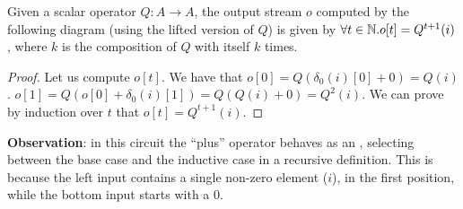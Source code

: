 \begin{theorem}
Given a scalar operator $Q: A \rightarrow A$, the output stream $o$ computed by the 
following diagram (using the lifted version of $Q$) is given by $\forall t \in \mathbb{N} . o[t] = Q^{t+1}(i)$, where $k$ is the composition
of $Q$ with itself $k$ times.

\end{theorem}
\begin{proof}
  Let us compute $o[t]$.  We have that $o[0] =
  Q(\delta_0(i)[0] + 0) = Q(i)$.  $o[1] =
  Q(o[0] + \delta_0(i)[1]) =
  Q(Q(i) + 0) = Q^2(i)$.  We can prove by induction
  over $t$ that $o[t] = Q^{t+1}(i)$.
\end{proof}

\textbf{Observation}: in this circuit the ``plus'' operator behaves as an , selecting between
the base case and the inductive case in a recursive definition.  
This is because the left input contains a single non-zero
element ($i$), in the first position, while the bottom input starts with a 0. 


